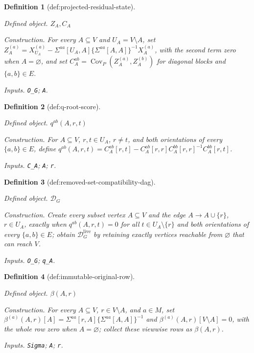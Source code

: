 \documentclass{article}
\newtheorem{definition}{Definition}
\begin{document}
\begin{definition}[def:projected-residual-state]\label{def:projected-residual-state}
\par\smallskip\noindent\emph{Defined object.} \(Z_A,C_A\)
\par\smallskip\noindent\emph{Construction.} For every \(A\subseteq V\) and \(U_A=V\setminus A\), set \(Z_A^{(a)}=X_{U_A}^{(a)}-\Sigma^{aa}[U_A,A]\{\Sigma^{aa}[A,A]\}^{-1}X_A^{(a)}\), with the second term zero when \(A=\varnothing\), and set \(C_A^{ab}=\operatorname{Cov}_P(Z_A^{(a)},Z_A^{(b)})\) for diagonal blocks and \(\{a,b\}\in E\).
\par\smallskip\noindent\emph{Inputs.} \texttt{O\_\allowbreak{}G}; \texttt{A}.
\end{definition}

\begin{definition}[def:q-root-score]\label{def:q-root-score}
\par\smallskip\noindent\emph{Defined object.} \(q^{ab}(A,r,t)\)
\par\smallskip\noindent\emph{Construction.} For \(A\subseteq V\), \(r,t\in U_A\), \(r\ne t\), and both orientations of every \(\{a,b\}\in E\), define \(q^{ab}(A,r,t)=C_A^{ab}[r,t]-C_A^{ab}[r,r]C_A^{bb}[r,r]^{-1}C_A^{bb}[r,t]\).
\par\smallskip\noindent\emph{Inputs.} \texttt{C\_\allowbreak{}A}; \texttt{A}; \texttt{r}.
\end{definition}

\begin{definition}[def:removed-set-compatibility-dag]\label{def:removed-set-compatibility-dag}
\par\smallskip\noindent\emph{Defined object.} \(\mathcal D_G\)
\par\smallskip\noindent\emph{Construction.} Create every subset vertex \(A\subseteq V\) and the edge \(A\to A\cup\{r\}\), \(r\in U_A\), exactly when \(q^{ab}(A,r,t)=0\) for all \(t\in U_A\setminus\{r\}\) and both orientations of every \(\{a,b\}\in E\); obtain \(\mathcal D_G^{\mathrm{live}}\) by retaining exactly vertices reachable from \(\varnothing\) that can reach \(V\).
\par\smallskip\noindent\emph{Inputs.} \texttt{O\_\allowbreak{}G}; \texttt{q\_\allowbreak{}A}.
\end{definition}

\begin{definition}[def:immutable-original-row]\label{def:immutable-original-row}
\par\smallskip\noindent\emph{Defined object.} \(\beta(A,r)\)
\par\smallskip\noindent\emph{Construction.} For every \(A\subseteq V\), \(r\in V\setminus A\), and \(a\in M\), set \(\beta^{(a)}(A,r)[A]=\Sigma^{aa}[r,A]\{\Sigma^{aa}[A,A]\}^{-1}\) and \(\beta^{(a)}(A,r)[V\setminus A]=0\), with the whole row zero when \(A=\varnothing\); collect these viewwise rows as \(\beta(A,r)\).
\par\smallskip\noindent\emph{Inputs.} \texttt{Sigma}; \texttt{A}; \texttt{r}.
\end{definition}
\end{document}
